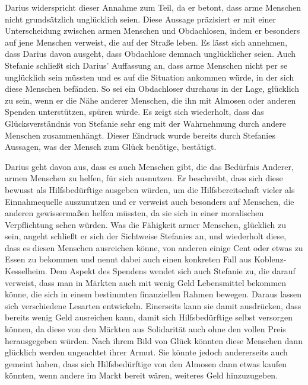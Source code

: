 Darius widerspricht dieser Annahme zum Teil, da er betont, dass arme Menschen nicht grundsätzlich unglücklich seien. 
Diese Aussage präzisiert er mit einer Unterscheidung zwischen armen Menschen und Obdachlosen, indem er besonders auf jene Menschen verweist, die auf der Straße leben.
Es lässt sich annehmen, dass Darius davon ausgeht, dass Obdachlose demnach unglücklicher seien. 
Auch Stefanie schließt sich Darius' Auffassung an, dass arme Menschen nicht per se unglücklich sein müssten und es auf die Situation ankommen würde, in der sich diese Menschen befänden. 
So sei ein Obdachloser durchaus in der Lage, glücklich zu sein, wenn er die Nähe anderer Menschen, die ihn mit Almosen oder anderen Spenden unterstützen, spüren würde. 
Es zeigt sich wiederholt, dass das Glücksverständnis von Stefanie sehr eng mit der Wahrnehmung durch andere Menschen zusammenhängt. 
Dieser Eindruck wurde bereits durch Stefanies Aussagen, was der Mensch zum Glück benötige, bestätigt.

Darius geht davon aus, dass es auch Menschen gibt, die das Bedürfnis Anderer, armen Menschen zu helfen, für sich ausnutzen. 
Er beschreibt, dass sich diese bewusst als Hilfsbedürftige ausgeben würden, um die Hilfsbereitschaft vieler als Einnahmequelle auszunutzen und er verweist auch besonders auf Menschen, die anderen gewissermaßen helfen müssten, da sie sich in einer moralischen Verpflichtung sehen würden. 
Was die Fähigkeit armer Menschen, glücklich zu sein, angeht schließt er sich der Sichtweise Stefanies an, und wiederholt diese, dass es diesen Menschen ausreichen könne, von anderen einige Cent oder etwas zu Essen zu bekommen und nennt dabei auch einen konkreten Fall aus Koblenz-Kesselheim. 
Dem Aspekt des Spendens wendet sich auch Stefanie zu, die darauf verweist, dass man in Märkten auch mit wenig Geld Lebensmittel bekommen könne, die sich in einem bestimmten finanziellen Rahmen bewegen. 
Daraus lassen sich verschiedene Lesarten entwickeln. 
Einerseits kann sie damit ausdrücken, dass bereits wenig Geld ausreichen kann, damit sich Hilfsbedürftige selbst versorgen können, da diese von den Märkten aus Solidarität auch ohne den vollen Preis herausgegeben würden. 
Nach ihrem Bild von Glück könnten diese Menschen dann glücklich werden ungeachtet ihrer Armut. 
Sie könnte jedoch andererseits auch gemeint haben, dass sich Hilfsbedürftige von den Almosen dann etwas kaufen könnten, wenn andere im Markt bereit wären, weiteres Geld hinzuzugeben. 


